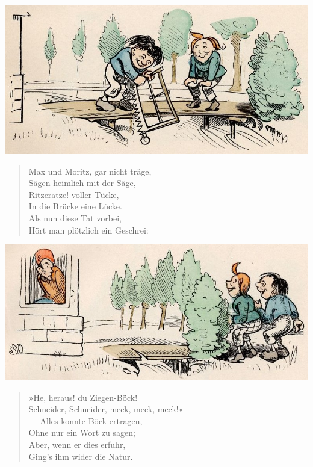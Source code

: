 \documentclass[a4paper,12pt]{article}
\begin{document}
\begin{center}\includegraphics[scale=.7, alt={... und die Säge}]{images/3-03.jpg}\end{center}



\begin{verse}
Max und Moritz, gar nicht träge,\\{}
Sägen heimlich mit der Säge,\\{}
Ritzeratze! voller Tücke,\\{}
In die Brücke eine Lücke.\\{}
Als nun diese Tat vorbei,\\{}
Hört man plötzlich ein Geschrei:
\end{verse}



\begin{center}\includegraphics[scale=.7, alt={He! Heraus!}]{images/3-04.jpg}\end{center}



\begin{verse}
»He, heraus! du Ziegen-Böck!\\{}
Schneider, Schneider, meck, meck, meck!«~—\\{}
— Alles konnte Böck ertragen,\\{}
Ohne nur ein Wort zu sagen;\\{}
Aber, wenn er dies erfuhr,\\{}
Ging's ihm wider die Natur.
\end{verse}
\end{document}
